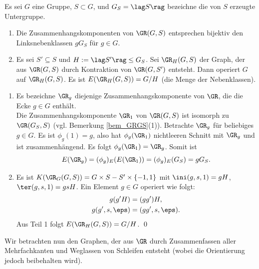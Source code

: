 \PROP Es sei $G$ eine Gruppe, $S\subset G$, und $G_S=\lag S\rag$
bezeichne die von $S$ erzeugte Untergruppe.
\begin{enumerate}
\item Die Zusammenhangskomponenten von $\GR(G,S)$ entsprechen
bijektiv den Linksnebenklassen $g G_S$ für $g\in G$.
\item Es sei $S'\subseteq S$ und $H:=\lag S'\rag \leq G_S$.
Sei $\GR_H(G,S)$ der Graph, der aus $\GR(G,S)$ durch Kontraktion
von $\GR(G,S')$ entsteht.
Dann operiert $G$ auf $\GR_H(G,S)$.
Es ist $E(\GR_H(G,S)) = G/H$ (die Menge der Nebenklassen).
\end{enumerate}
\bew \begin{enumerate}
\item Es bezeichne $\GR_g$ diejenige Zusammenhangskomponente von
$\GR$, die die Ecke $g\in G$ enthält.\\
Die Zusammenhangskomponente $\GR_1$ von $\GR(G,S)$ ist isomorph
zu $\GR(G_S,S)$ (vgl. Bemerkung \ref{bem_GRGS}(1)).
Betrachte $\GR_g$ für beliebiges $g\in G$. Es ist $\phi_g(1)=g$,
also hat $\phi_g(\GR_1)$ nichtleeren Schnitt mit $\GR_g$ und ist
zusammenhängend. Es folgt $\phi_g(\GR_1)=\GR_g$.
Somit ist
\[
E(\GR_g)=(\phi_g)_E(E(\GR_1))=(\phi_g)_E(G_S) = g G_S.
\]
\item
Es ist $K(\GR_G(G,S))=G\times S-S'\times\{-1,1\}$ mit
$\ini(g,s,1)=gH$, $\ter(g,s,1)=gsH$.
Ein Element $g\in G$ operiert wie folgt:
\begin{align*}
g(g'H) &= (gg')H, \\
g(g',s,\eps) &= (gg',s,\eps).
\end{align*}
Aus Teil 1 folgt $E(\GR_H(G,S))=G/H$.
\qed
\end{enumerate}

Wir betrachten nun den Graphen, der aus $\GR$ durch Zusammenfassen
aller Mehrfachkanten und Weglassen von Schleifen entsteht
(wobei die Orientierung jedoch beibehalten wird).

